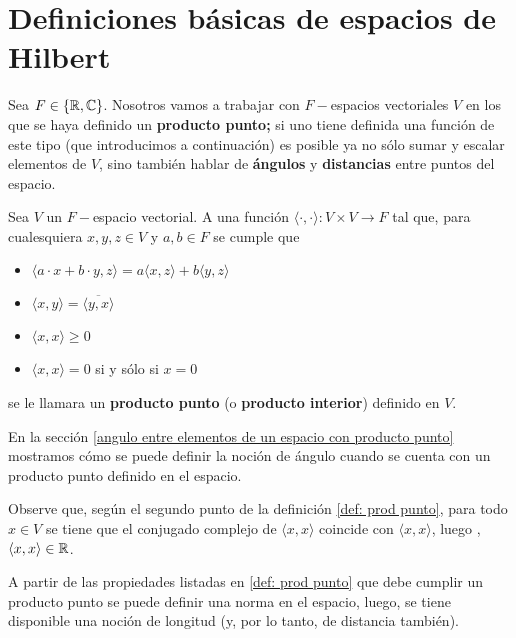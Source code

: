 \section{Definiciones básicas de espacios de Hilbert}

Sea $F \in \{ \mathbb{R}, \mathbb{C} \}$.
Nosotros vamos a trabajar con $F-$espacios vectoriales
$V$ en los que se haya definido un \textbf{producto punto;}
si uno tiene definida una función
de este tipo (que introducimos a continuación)
es posible ya no sólo sumar y escalar elementos de $V$, sino
también hablar de \textbf{ángulos}
y \textbf{distancias} entre puntos del espacio.


\begin{defi}
\label{def: prod punto}
Sea $V$ un $F-$espacio vectorial. A una función
$\langle \cdot, \cdot \rangle : V \times V \longrightarrow F$
tal que, para cualesquiera $x, y, z \in V$ 
y $a, b \in F$
se cumple que 

	\begin{itemize}
	\item $\langle a \cdot x + b \cdot y, z \rangle = 
	a \langle x, z \rangle + b \langle y, z \rangle$
	\item $\langle x, y \rangle = \overline{\langle y, x \rangle} $
	\item $\langle x, x \rangle \geq 0 $
	\item $\langle x, x \rangle = 0 $ si y sólo si $x=0$
	\end{itemize}
se le llamara un \textbf{producto punto} (o \textbf{producto interior})
definido en $V$.
\end{defi}


En la sección
\ref{angulo entre elementos de un espacio con producto punto}
mostramos cómo se puede definir la noción de ángulo cuando
se cuenta con un producto punto definido en el espacio.


Observe que, según el segundo punto de la definición 
\ref{def: prod punto}, 
para todo $x \in V$ se tiene que el conjugado complejo
de $\langle x, x \rangle$ coincide con $\langle x, x \rangle$, luego
,
$\langle x, x \rangle \in \mathbb{R}$.

A partir de las propiedades listadas en 
\ref{def: prod punto}
que debe cumplir un 
producto punto se puede definir una norma
 en el espacio, luego, 
se tiene disponible
una noción de longitud (y, por lo tanto, de distancia también).

